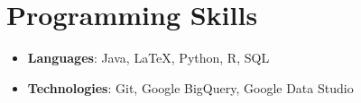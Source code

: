 \documentclass[letterpaper,11pt]{article}
\newcommand{\resumeItem}[2]{
  \item\small{
    \textbf{#1}{: #2 \vspace{-2pt}}
  }
}
\newcommand{\resumeSubItem}[2]{\resumeItem{#1}{#2}\vspace{-4pt}}
\newcommand{\resumeSubHeadingListStart}{\begin{itemize}[leftmargin=*]}
\newcommand{\resumeSubHeadingListEnd}{\end{itemize}}
\begin{document}
\section{Programming Skills}
  \resumeSubHeadingListStart
    \resumeSubItem{Languages}{Java, LaTeX, Python, R, SQL}
    \resumeSubItem{Technologies}{Git, Google BigQuery, Google Data Studio}
  \resumeSubHeadingListEnd

\end{document}
